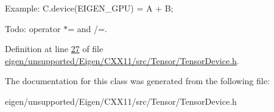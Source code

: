 Example\+: C.\+device(\+E\+I\+G\+E\+N\+\_\+\+G\+P\+U) = A + B;

Todo\+: operator $\ast$= and /=. 

Definition at line \hyperlink{eigen_2unsupported_2_eigen_2_c_x_x11_2src_2_tensor_2_tensor_device_8h_source_l00027}{27} of file \hyperlink{eigen_2unsupported_2_eigen_2_c_x_x11_2src_2_tensor_2_tensor_device_8h_source}{eigen/unsupported/\+Eigen/\+C\+X\+X11/src/\+Tensor/\+Tensor\+Device.\+h}.



The documentation for this class was generated from the following file\+:\begin{DoxyCompactItemize}
\item 
eigen/unsupported/\+Eigen/\+C\+X\+X11/src/\+Tensor/\+Tensor\+Device.\+h\end{DoxyCompactItemize}
